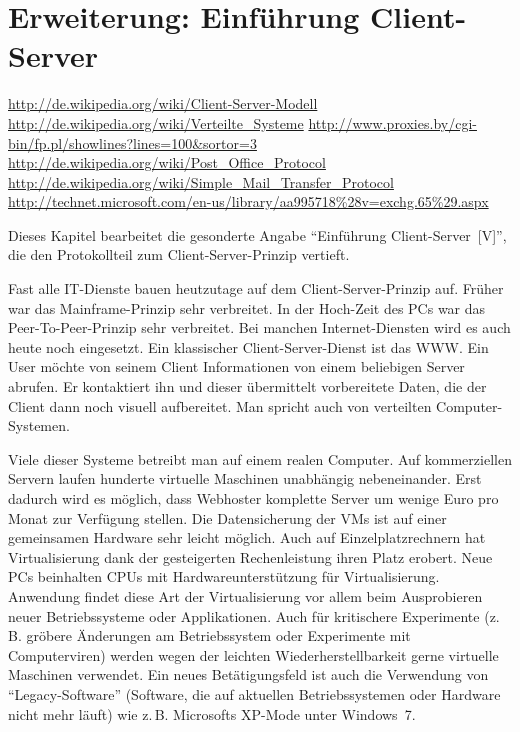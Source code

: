 \chapter{Erweiterung: Einführung Client-Server}
\label{kap:erweiterung}

\urldef\angabeurlclientserver\url{http://de.wikipedia.org/wiki/Client-Server-Modell}
\urldef\angabeurlverteilt\url{http://de.wikipedia.org/wiki/Verteilte_Systeme}
\urldef\angabeurlproxies\url{http://www.proxies.by/cgi-bin/fp.pl/showlines?lines=100&sortor=3}
\urldef\angabeurlpop\url{http://de.wikipedia.org/wiki/Post_Office_Protocol}
\urldef\angabeurlsmtp\url{http://de.wikipedia.org/wiki/Simple_Mail_Transfer_Protocol}
\urldef\angabeurltechnet\url{http://technet.microsoft.com/en-us/library/aa995718%28v=exchg.65%29.aspx}

Dieses Kapitel bearbeitet die gesonderte Angabe \enquote{Einführung Client-Server~[V]}, die den Protokollteil zum Client-Server-Prinzip vertieft.

\begin{aufgabe}
Fast alle IT-Dienste bauen heutzutage auf dem Client-Server-Prinzip auf. Früher war das Mainframe-Prinzip sehr verbreitet. In der Hoch-Zeit des PCs war das Peer-To-Peer-Prinzip sehr verbreitet. Bei manchen Internet-Diensten wird es auch heute noch eingesetzt. Ein klassischer Client-Server-Dienst ist das WWW. Ein User möchte von seinem Client Informationen von einem beliebigen Server abrufen. Er kontaktiert ihn und dieser übermittelt vorbereitete Daten, die der Client dann noch visuell aufbereitet. Man spricht auch von verteilten Computer-Systemen.

Viele dieser Systeme betreibt man auf einem realen Computer. Auf kommerziellen Servern laufen hunderte virtuelle Maschinen unabhängig nebeneinander. Erst dadurch wird es möglich, dass Webhoster komplette Server um wenige Euro pro Monat zur Verfügung stellen. Die Datensicherung der VMs ist auf einer gemeinsamen Hardware sehr leicht möglich. Auch auf Einzelplatzrechnern hat Virtualisierung dank der gesteigerten Rechenleistung ihren Platz erobert. Neue PCs beinhalten CPUs mit Hardwareunterstützung für Virtualisierung. Anwendung findet diese Art der Virtualisierung vor allem beim Ausprobieren neuer Betriebssysteme oder Applikationen. Auch für kritischere Experimente (z.\,B. gröbere Änderungen am Betriebssystem oder Experimente mit Computerviren) werden wegen der leichten Wiederherstellbarkeit gerne virtuelle Maschinen verwendet. Ein neues Betätigungsfeld ist auch die Verwendung von \enquote{Legacy-Software} (Software, die auf aktuellen Betriebssystemen oder Hardware nicht mehr läuft) wie z.\,B. Microsofts XP-Mode unter Windows~7.
\end{aufgabe}

